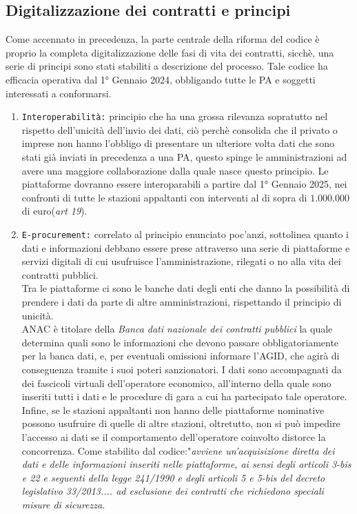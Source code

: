 \documentclass{article}
\begin{document}
\newpage\subsection{Digitalizzazione dei contratti e principi}
\begin{justify}
    Come accennato in precedenza, la parte centrale della riforma del codice è proprio la completa digitalizzazione delle fasi di vita dei contratti, sicchè, una serie di principi sono stati stabiliti a descrizione del processo.
    Tale codice ha efficacia operativa dal 1° Gennaio 2024, obbligando tutte le PA e soggetti interessati a conformarsi.\\
    \begin{enumerate}
        \item \texttt{Interoperabilità:} principio che ha una grossa rilevanza sopratutto nel rispetto dell'unicità dell'invio dei dati, ciò perchè consolida che il privato o imprese non hanno l'obbligo di presentare un ulteriore volta dati che sono stati già inviati in precedenza a una PA, questo spinge le amministrazioni ad avere una maggiore collaborazione dalla quale nasce questo principio. Le piattaforme dovranno essere interoparabili a partire dal 1° Gennaio 2025, nei confronti di tutte le stazioni appaltanti con interventi al di sopra di $1.000.000$ di euro(\textit{art 19}).
        \item \texttt{E-procurement:} correlato al principio enunciato poc'anzi, sottolinea quanto i dati e informazioni debbano essere prese attraverso una serie di piattaforme e servizi digitali di cui usufruisce l'amministrazione, rilegati o no alla vita dei contratti pubblici.\\ Tra le piattaforme ci sono le banche dati degli enti che danno la possibilità di prendere i dati da parte di altre amministrazioni, rispettando il principio di unicità.\\
        ANAC è titolare della \textit{Banca dati nazionale dei contratti pubblici} la quale determina quali sono le informazioni che devono passare obbligatoriamente per la banca dati, e, per eventuali omissioni informare l'AGID, che agirà di conseguenza tramite i suoi poteri sanzionatori. I dati sono accompagnati da dei fascicoli virtuali dell'operatore economico, all'interno della quale sono inseriti tutti i dati e le procedure di gara a cui ha partecipato tale operatore. Infine, se le stazioni appaltanti non hanno delle piattaforme nominative possono usufruire di quelle di altre stazioni, oltretutto, non si può impedire l'accesso ai dati se il comportamento dell'operatore coinvolto distorce la concorrenza. Come stabilito dal codice:"\textit{avviene un'acquisizione diretta dei dati e delle informazioni inseriti nelle piattaforme, ai sensi degli articoli 3-bis e 22 e seguenti della legge 241/1990 e degli articoli 5 e 5-bis del decreto legislativo 33/2013.... ad esclusione dei contratti che richiedono speciali misure di sicurezza}.\\

\end{enumerate}
\end{justify}
\end{document}
